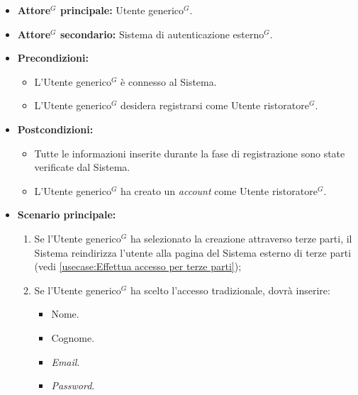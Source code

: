 \label{usecase:Effettua registrazione \gls{Utente ristoratore}$^G$}
\begin{itemize}

	\item \textbf{\gls{Attore}$^G$ principale:} \gls{Utente generico}$^G$.
	\item \textbf{\gls{Attore}$^G$ secondario:} Sistema di autenticazione esterno$^G$. 

	\item \textbf{Precondizioni:} 
	\begin{itemize}
        \item  L'\gls{Utente generico}$^G$ è connesso al Sistema.
        \item  L'\gls{Utente generico}$^G$ desidera registrarsi come \gls{Utente ristoratore}$^G$.
    \end{itemize}
    

	\item \textbf{Postcondizioni:} 
    \begin{itemize}
        \item  Tutte le informazioni inserite durante la fase di registrazione sono state verificate dal Sistema.
        \item  L'\gls{Utente generico}$^G$ ha creato un \textit{account} come \gls{Utente ristoratore}$^G$.
    \end{itemize}

	\item \textbf{Scenario principale:}
	\begin{enumerate}

            \item Se l'\gls{Utente generico}$^G$ ha selezionato la creazione attraverso terze parti, il Sistema reindirizza l'utente alla pagina del Sistema esterno di terze parti (vedi \autoref{usecase:Effettua accesso per terze parti});
            \item Se l'\gls{Utente generico}$^G$ ha scelto l'accesso tradizionale, dovrà inserire:
            \begin{itemize}
                \item Nome.
                \item Cognome.
                \item \textit{Email}.
                \item \textit{Password}.
            \end{itemize}


\end{enumerate}
\end{itemize}
